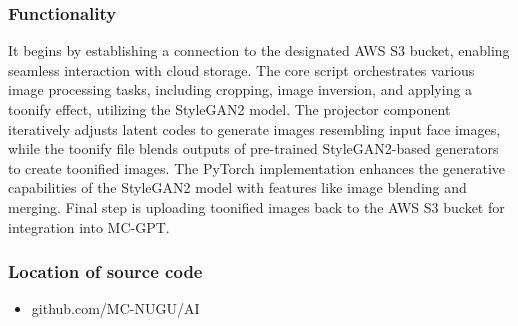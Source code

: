 \documentclass[conference]{IEEEtran}
\begin{document}
        \subsubsection{Functionality}
            It begins by establishing a connection to the designated AWS S3 bucket, enabling seamless interaction with cloud storage. The core script orchestrates various image processing tasks, including cropping, image inversion, and applying a toonify effect, utilizing the StyleGAN2 model. The projector component iteratively adjusts latent codes to generate images resembling input face images, while the toonify file blends outputs of pre-trained StyleGAN2-based generators to create toonified images. The PyTorch implementation enhances the generative capabilities of the StyleGAN2 model with features like image blending and merging. Final step is uploading toonified images back to the AWS S3 bucket for integration into MC-GPT.\\
        \subsubsection{Location of source code}
            \begin{itemize}
                \item github.com/MC-NUGU/AI
            \end{itemize}
\end{document}
